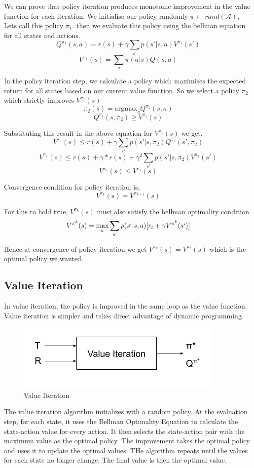 \documentclass[11pt]{article}
\begin{document}
We can prove that policy iteration produces monotonic improvement in the value function for each iteration. We initialise our policy randomly $\pi \gets rand(\mathcal{A})$, Lets call this policy $\pi_1$. then we evaluate this policy using the bellman equation for all states and actions.
$$Q^{\pi_1}(s,a) = r(s) + \gamma \sum\limits_{s'} p(s'|s,a)V^{\pi_1}(s') $$
$$ V^{\pi_1}(s) = \sum_a \pi(a|s)Q(s,a)  $$

In the policy iteration step, we calculate a policy which maximises the expected return for all states based on our current value function. So we select a policy $\pi_2$ which strictly improves $V^{\pi_1}(s)$
$$ \pi_2(s) = \text{argmax}_a Q^{\pi_1}(s,a)$$
$$ Q^{\pi_1}(s,\pi_2) \geq V^{\pi_1}(s)  $$

Substituting this result in the above equation for $V^{\pi_1}(s) $ we get,
$$ V^{\pi_1}(s) \leq  r(s) + \gamma \sum\limits_{s'} p(s'|s,\pi_2)Q^{\pi_1}(s',\pi_2) $$
$$ V^{\pi_1}(s) \leq  r(s) + \gamma*r(s) + \gamma^2 \sum\limits_{s'} p(s'|s,\pi_2)V^{\pi_2}(s') $$
$$ V^{\pi_1}(s) \leq V^{\pi_2}(s) $$

Convergence condition for policy iteration is,
$$ V^{\pi_k}(s) = V^{\pi_{k+1}}(s) $$

For this to hold true, $V^{\pi_k}(s) $ must also satisfy the bellman optimality condition
$$ V^{\pi^k}(s) = \max_a \sum_{s`} p(s`|s,a)[r_t + \gamma V^{\pi^k}(s`)] $$

Hence at convergence of policy iteration we get $ V^{\pi_k}(s) = V^{\pi_*}(s) $ which is the optimal policy we wanted.



\subsection{Value Iteration}
In value iteration, the policy is improved in the same loop as the value function.
Value iteration is simpler and takes direct advantage of dynamic programming.
\begin{figure}[H]
    \centering
    \includegraphics[width=0.4\linewidth]{Value iteration.png}
    \caption{Value Iteration}
    \label{fig:my_label}
\end{figure}

The value iteration algorithm initializes with a random policy. At the evaluation step, for each state, it uses the Bellman Optimality Equation to calculate the state-action value for every action. It then selects the state-action pair with the maximum value as the optimal policy. The improvement takes the optimal policy and uses it to update the optimal values. THe algorithm repeats until the values for each state no longer change. The final value is then the optimal value.
\end{document}
